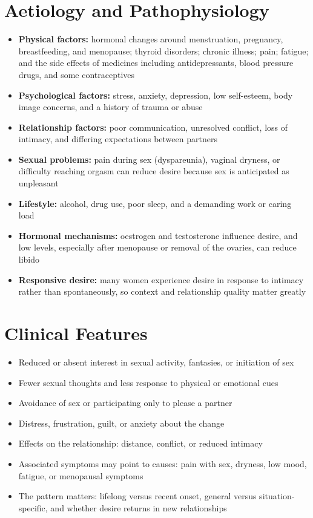 \section*{Aetiology and Pathophysiology}
\begin{itemize}
    \item \textbf{Physical factors:} hormonal changes around menstruation, pregnancy, breastfeeding, and menopause; thyroid disorders; chronic illness; pain; fatigue; and the side effects of medicines including antidepressants, blood pressure drugs, and some contraceptives
    \item \textbf{Psychological factors:} stress, anxiety, depression, low self-esteem, body image concerns, and a history of trauma or abuse
    \item \textbf{Relationship factors:} poor communication, unresolved conflict, loss of intimacy, and differing expectations between partners
    \item \textbf{Sexual problems:} pain during sex (dyspareunia), vaginal dryness, or difficulty reaching orgasm can reduce desire because sex is anticipated as unpleasant
    \item \textbf{Lifestyle:} alcohol, drug use, poor sleep, and a demanding work or caring load
    \item \textbf{Hormonal mechanisms:} oestrogen and testosterone influence desire, and low levels, especially after menopause or removal of the ovaries, can reduce libido
    \item \textbf{Responsive desire:} many women experience desire in response to intimacy rather than spontaneously, so context and relationship quality matter greatly
\end{itemize}

\section*{Clinical Features}
\begin{itemize}
    \item Reduced or absent interest in sexual activity, fantasies, or initiation of sex
    \item Fewer sexual thoughts and less response to physical or emotional cues
    \item Avoidance of sex or participating only to please a partner
    \item Distress, frustration, guilt, or anxiety about the change
    \item Effects on the relationship: distance, conflict, or reduced intimacy
    \item Associated symptoms may point to causes: pain with sex, dryness, low mood, fatigue, or menopausal symptoms
    \item The pattern matters: lifelong versus recent onset, general versus situation-specific, and whether desire returns in new relationships
\end{itemize}

